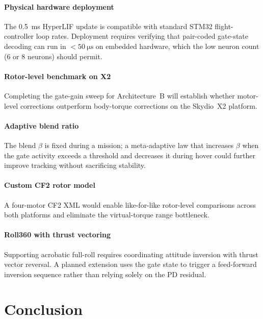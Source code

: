 \documentclass[conference]{IEEEtran}
\begin{document}
\paragraph{Physical hardware deployment}
The \SI{0.5}{\milli\second} HyperLIF update is compatible with standard STM32
flight-controller loop rates.
Deployment requires verifying that pair-coded gate-state decoding can run in
$<\SI{50}{\micro\second}$ on embedded hardware, which the low neuron count
(6 or 8 neurons) should permit.

\paragraph{Rotor-level benchmark on X2}
Completing the gate-gain sweep for Architecture~B will establish whether
motor-level corrections outperform body-torque corrections on the Skydio~X2
platform.

\paragraph{Adaptive blend ratio}
The blend $\beta$ is fixed during a mission; a meta-adaptive law that increases
$\beta$ when the gate activity exceeds a threshold and decreases it during
hover could further improve tracking without sacrificing stability.

\paragraph{Custom CF2 rotor model}
A four-motor CF2 XML would enable like-for-like rotor-level comparisons across
both platforms and eliminate the virtual-torque range bottleneck.

\paragraph{Roll360 with thrust vectoring}
Supporting acrobatic full-roll requires coordinating attitude inversion with
thrust vector reversal.
A planned extension uses the gate state to trigger a feed-forward inversion
sequence rather than relying solely on the PD residual.

\section{Conclusion}
\label{sec:conclusion}
\end{document}

